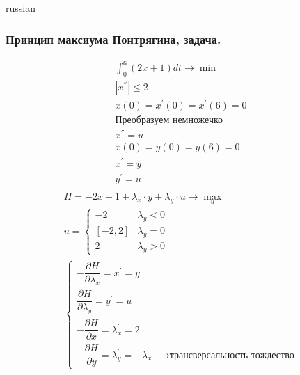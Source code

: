 \documentclass{article}
\begin{document}
\begin{otherlanguage*}{russian}
\subsubsection*{Принцип максиума Понтрягина, задача.}
\begin{align*}
\int_0^6 (2x + 1) dt \rightarrow \min \\
| x ^ {''} | \le 2 \\
x(0) = x^{'} (0) = x^{'} (6) = 0 \\
\text{Преобразуем немножечко} \\
x^{''} = u \\
x(0) = y(0) = y(6) = 0 \\
x^{'} = y \\
y^{'} = u \\
\end{align*}
\begin{align*}
H = - 2 x -1  + \lambda_x \cdot y + \lambda_y  \cdot u \rightarrow \max_u \\
u = \begin{cases}
-2 & \lambda_y < 0 \\
[-2, 2 ] & \lambda_y = 0 \\
2 & \lambda_y > 0 
\end{cases} \\
\begin{cases}
- \dfrac{\partial H}{\partial \lambda_x} = x^{'} = y \\
\dfrac{\partial H}{\partial \lambda_y} = y^{'} = u \\
- \dfrac{\partial H}{\partial x} = \lambda^{'}_x = 2 \\
- \dfrac{\partial H}{\partial y} = \lambda^{'}_y = - \lambda_x & \rightarrow \text{трансверсальность тождество}
\end{cases}
\end{align*}
\end{otherlanguage*}
\end{document}

